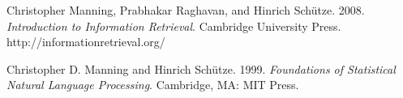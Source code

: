 \documentclass[11pt]{article}
\def\url#1{{\small\sf #1}}
\begin{document}
\begin{vita}
\begin{Products (most closely related)}



\end{Products (most closely related)}


\begin{Products (other significant)}

\item Christopher Manning, Prabhakar Raghavan, and Hinrich Sch\"utze. 2008. \emph{Introduction to Information Retrieval}.  Cambridge University Press.
\url{http://informationretrieval.org/}

\item Christopher D. Manning and Hinrich Sch\"utze. 1999. {\em Foundations
of Statistical Natural Language Processing}.  Cambridge, MA: MIT Press.





\end{Products (other significant)}
\end{vita}
\end{document}

